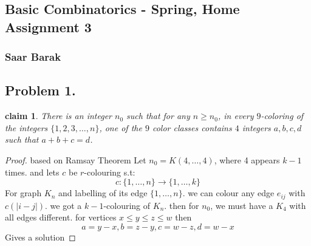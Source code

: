 \documentclass[12pt]{article}
\newtheorem*{claim*}{claim}
\begin{document}
\begin{center}
\section*{Basic Combinatorics - Spring, Home Assignment 3}
\subsubsection*{Saar Barak}
\end{center}
\subsection*{Problem 1.}
\begin{claim*}
There is an integer $n_0$ such that for any $n\ge n_0$, in every $9$-coloring of the integers $\{1,2,3,\dots,n\}$, one of the $9$ color classes contains $4$ integers $a,b,c,d$ such that $a+b+c=d$.
\end{claim*}
\begin{proof}
based on Ramsay Theorem Let $n_0=K(4,\dots,4)$, where 4 appears $k-1$ times. 
and lets $c$ be $r$-colouring s.t:\[c:\{1,\dots,n\}\to\{1,\dots, k\}\]
For graph $K_n$ and labelling of its edge $\{1,\dots,n\}$.
we can colour any edge $e_{ij}$ with $c(|i-j|)$. we got a $k-1$-colouring of $K_n$. then for $n_0$, we must have a $K_4$ with all  edges different. 
 for vertices $x\le y\le z \le w$ then \[a=y-x,b=z-y,c=w-z,d=w-x\] Gives a solution
\end{proof}
\end{document}
